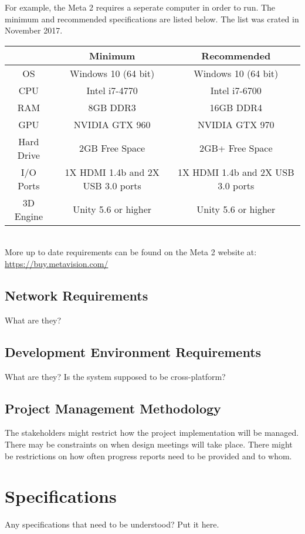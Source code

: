 For example, the Meta 2 requires a seperate computer in order to run.  The minimum and recommended specifications are listed below.  The list was crated in November 2017.

\begin{center}
	\begin{tabular}{ | c | c | c | }
		\hline
		& Minimum & Recommended \\ \hline
		OS & Windows 10 (64 bit) & 	Windows 10 (64 bit) \\ \hline
		CPU & Intel i7-4770 & Intel i7-6700 \\ \hline
		RAM & 8GB DDR3 & 16GB DDR4 \\ \hline
		GPU & NVIDIA GTX 960 & NVIDIA GTX 970 \\ \hline
		Hard Drive & 2GB Free Space & 2GB+ Free Space \\ \hline
		I/O Ports & 1X HDMI 1.4b and 2X USB 3.0 ports & 1X HDMI 1.4b and 2X USB 3.0 ports \\ \hline
		3D Engine & Unity 5.6 or higher & Unity 5.6 or higher \\ \hline
	\end{tabular}
	\\
	More up to date requirements can be found on the Meta 2 website at: \url{https://buy.metavision.com/}
\end{center}


\subsection{Network Requirements}
What are they? 


\subsection{Development Environment Requirements}
What are they?  Is the system supposed to be cross-platform? 

\subsection{Project  Management Methodology}
The stakeholders might restrict how the project implementation will be managed. 
 There may be constraints on when design meetings will take place.  There might 
be restrictions on how often progress reports need to be provided and to whom. 


\section{Specifications}
Any specifications that need to be understood?  Put it here.  

